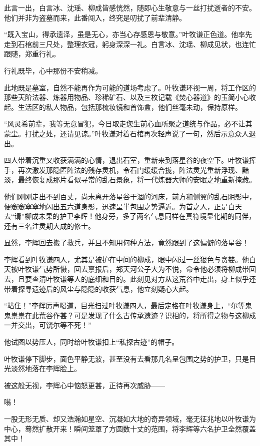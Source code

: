 此言一出，白言冰、沈瑶、柳成皆感恍然，随即心生敬意与一丝打扰逝者的不安。他们并非为盗墓而来，此番闯入，终究是叨扰了前辈清静。

“既入宝山，得承遗泽，虽是无心，亦当心存感恩与敬意。”叶牧谦正色道。他率先走到石棺前三尺处，整理衣冠，躬身深深一礼。白言冰、沈瑶、柳成见状，也连忙跟随，郑重行礼。

行礼既毕，心中那份不安稍减。

此地既是墓室，自然不能再作为可能的道场考虑了。叶牧谦环视一周，将工作区的那些天阶法器、炼器用物品、珍稀矿石、以及三枚记载《焚心器道》的玉简小心收起。生活区的私人物品，包括那梳妆镜和首饰盒，他们丝毫未动，保持原样。

“风灵希前辈，我等无意冒犯，今日取走您生前心血所聚之道统与作品，必不让其蒙尘。打扰之处，还请见谅。”叶牧谦对着石棺再次轻声说了一句，然后示意众人退出。

四人带着沉重又收获满满的心情，退出石室，重新来到落星谷的夜空下。叶牧谦挥手，再次激发那隐匿阵法的残存灵机，令石门缓缓合拢，阵法灵光重新浮现、黯淡，最终恢复成那片看似寻常的乱石景象，将一代炼器大师的安眠之地重新掩藏。

\vspace{2em}

他们刚刚走出不到百丈，尚未离开落星谷干涸的河床，前方和侧翼的乱石阴影中，便窸窸窣窣地闪出五六道身影，迅速呈半包围之势逼近。为首之人，正是白天去“请”柳成未果的护卫李辉！他身旁，多了两名气息同样在真符境显化期的同伴，还有三名注灵期大成的修士。

显然，李辉回去搬了救兵，并且不知用何种方法，竟然跟到了这偏僻的落星谷！

李辉看到叶牧谦四人，尤其是被护在中间的柳成，眼中闪过一丝狠色与贪婪。他白天被叶牧谦气势所慑，回去禀报后，郑天河公子大为不悦，命令他必须将柳成带回去，且要查清叶牧谦等人的底细和目的。此刻见对方从这荒谷中走出，身上似乎还带着探寻遗迹后的风尘与隐隐的收获气息，他立刻疑心大起。

“站住！”李辉厉声喝道，目光扫过叶牧谦四人，最后定格在叶牧谦身上，“尔等鬼鬼祟祟在此荒谷作甚？可是发现了什么古传承遗迹？识相的，将所得之物与这柳成一并交出，可饶尔等不死！”

他试图以势压人，同时给叶牧谦扣上“私探古迹”的帽子。

叶牧谦停下脚步，面色平静无波，甚至没有去看那几名呈包围之势的护卫，只是目光淡然地落在李辉脸上。

被这般无视，李辉心中恼怒更甚，正待再次威胁——

嗡！

一股无形无质、却又浩瀚如星空、沉凝如大地的奇异领域，毫无征兆地以叶牧谦为中心，蓦然扩散开来！瞬间笼罩了方圆数十丈的范围，将李辉等六名护卫全然覆盖其中！

